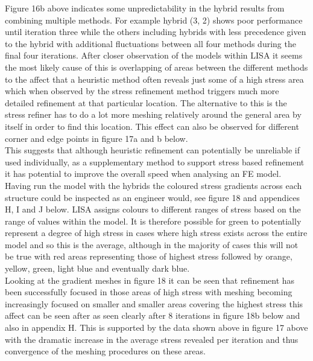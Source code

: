 \noindent
Figure 16b above indicates some unpredictability in the hybrid results from combining multiple methods. For example hybrid (3, 2) shows poor performance until iteration three while the others including hybrids with less precedence given to the hybrid with additional fluctuations between all four methods during the final four iterations. After closer observation of the models within LISA it seems the most likely cause of this is overlapping of areas between the different methods to the affect that a heuristic method often reveals just some of a high stress area which when observed by the stress refinement method triggers much more detailed refinement at that particular location. 
The alternative to this is the stress refiner has to do a lot more meshing relatively around the general area by itself in order to find this location. This effect can also be observed for different corner and edge points in figure 17a and b below. \\

\noindent
This suggests that although heuristic refinement can potentially be unreliable if used individually, as a supplementary method to support stress based refinement it has potential to improve the overall speed when analysing an FE model. \\

\noindent
Having run the model with the hybrids the coloured stress gradients across each structure could be inspected as an engineer would, see figure 18 and appendices H, I and J below. LISA assigns colours to different ranges of stress based on the range of values within the model. It is therefore possible for green to potentially represent a degree of high stress in cases where high stress exists across the entire model and so this is the average, although in the majority of cases this will not be true with red areas representing those of highest stress followed by orange, yellow, green, light blue and eventually dark blue.  \\ 


\noindent
Looking at the gradient meshes in figure 18 it can be seen that refinement has been successfully focused in those areas of high stress with meshing becoming increasingly focused on smaller and smaller areas covering the highest stress this affect can be seen after as seen clearly after 8 iterations in figure 18b below and also in appendix H. This is supported by the data shown above in figure 17 above with the dramatic increase in the average stress revealed per iteration and thus convergence of the meshing procedures on these areas. \\ 

